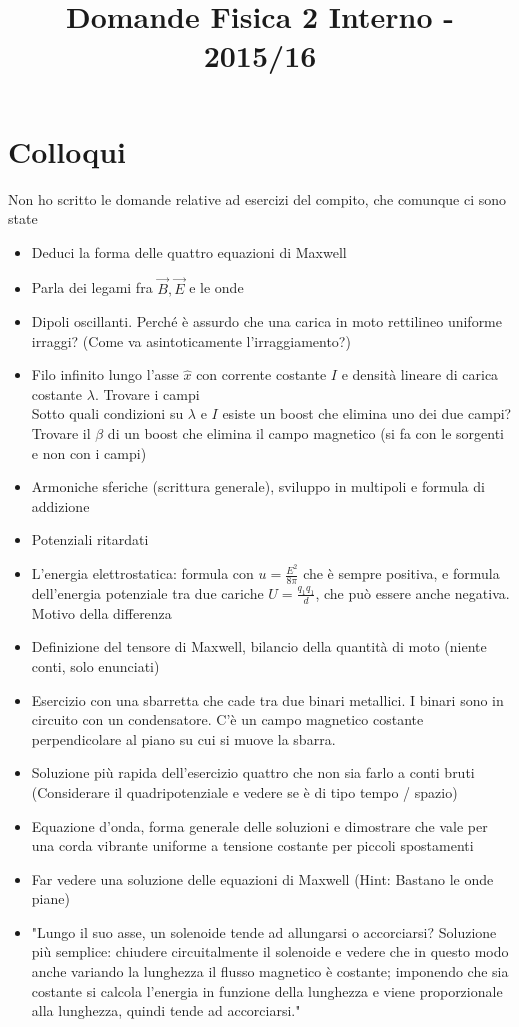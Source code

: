 \documentclass[a4paper,NoNotes,GeneralMath]{stdmdoc}
\begin{document}
	\title{Domande Fisica 2 Interno - 2015/16}
	
	\section*{Colloqui}
	Non ho scritto le domande relative ad esercizi del compito, che comunque ci sono state
	\begin{itemize}
		\item Deduci la forma delle quattro equazioni di Maxwell
		\item Parla dei legami fra $\vec{B}, \vec{E}$ e le onde
		\item Dipoli oscillanti. Perché è assurdo che una carica in moto rettilineo uniforme irraggi? (Come va asintoticamente l'irraggiamento?)
		\item Filo infinito lungo l'asse $\hat{x}$ con corrente costante $I$ e densità lineare di carica costante $\lambda$. Trovare i campi \\
			Sotto quali condizioni su $\lambda$ e $I$ esiste un boost che elimina uno dei due campi? Trovare il $\beta$ di un boost che elimina il campo magnetico (si fa con le sorgenti e non con i campi)
		\item Armoniche sferiche (scrittura generale), sviluppo in multipoli e formula di addizione
		\item Potenziali ritardati
		\item L'energia elettrostatica: formula con $u = \frac{E^2}{8\pi }$ che è sempre positiva, e formula dell'energia potenziale tra due cariche $U = \frac{q_1 q_1}{d}$, che può essere anche negativa. Motivo della differenza
		\item Definizione del tensore di Maxwell, bilancio della quantità di moto (niente conti, solo enunciati)
		\item Esercizio con una sbarretta che cade tra due binari metallici. I binari sono in circuito con un condensatore. C'è un campo magnetico costante perpendicolare al piano su cui si muove la sbarra.
		\item Soluzione più rapida dell'esercizio quattro che non sia farlo a conti bruti (Considerare il quadripotenziale e vedere se è di tipo tempo / spazio)
		\item Equazione d'onda, forma generale delle soluzioni e dimostrare che vale per una corda vibrante uniforme a tensione costante per piccoli spostamenti
		\item Far vedere una soluzione delle equazioni di Maxwell (Hint: Bastano le onde piane)
		\item "Lungo il suo asse, un solenoide tende ad allungarsi o accorciarsi? Soluzione più semplice: chiudere circuitalmente il solenoide e vedere che in questo modo anche variando la lunghezza il flusso magnetico è costante; imponendo che sia costante si calcola l’energia in funzione della lunghezza e viene proporzionale alla lunghezza, quindi tende ad accorciarsi."

\end{itemize}
\end{document}
